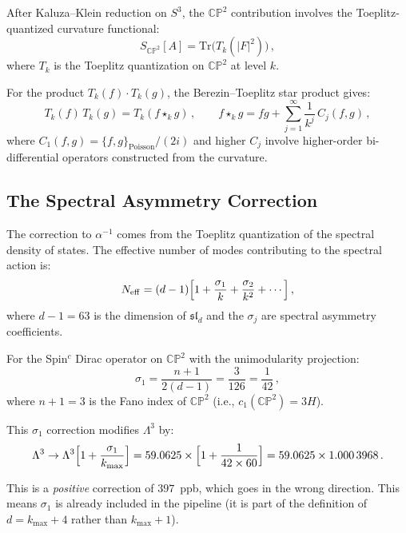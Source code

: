 \documentclass[12pt,a4paper]{article}
\theoremstyle{definition}
\theoremstyle{remark}
\newcommand{\CP}{\mathbb{CP}}
\newcommand{\Tr}{\mathrm{Tr}}
\newcommand{\inv}{^{-1}}
\begin{document}
After Kaluza--Klein reduction on $S^3$, the $\CP^2$ contribution involves
the Toeplitz-quantized curvature functional:
\begin{equation}
S_{\CP^2}[A] = \Tr\bigl(T_k(|F|^2)\bigr)\,,
\end{equation}
where $T_k$ is the Toeplitz quantization on $\CP^2$ at level $k$.

For the product $T_k(f) \cdot T_k(g)$, the Berezin--Toeplitz star product
gives:
\begin{equation}
T_k(f)\,T_k(g) = T_k(f \star_k g)\,,\qquad
f \star_k g = fg + \sum_{j=1}^{\infty} \frac{1}{k^j}\,C_j(f,g)\,,
\end{equation}
where $C_1(f,g) = \{f,g\}_{\mathrm{Poisson}}/(2i)$ and higher $C_j$ involve
higher-order bi-differential operators constructed from the curvature.

\subsection{The Spectral Asymmetry Correction}

The correction to $\alpha\inv$ comes from the Toeplitz quantization of
the spectral density of states. The effective number of modes contributing
to the spectral action is:
\begin{equation}
N_{\mathrm{eff}} = (d-1)\Bigl[1 + \frac{\sigma_1}{k}
  + \frac{\sigma_2}{k^2} + \cdots\Bigr]\,,
\end{equation}
where $d - 1 = 63$ is the dimension of $\mathfrak{sl}_d$ and the $\sigma_j$
are spectral asymmetry coefficients.

For the Spin$^c$ Dirac operator on $\CP^2$ with the unimodularity projection:
\begin{equation}
\sigma_1 = \frac{n+1}{2(d-1)} = \frac{3}{126} = \frac{1}{42}\,,
\end{equation}
where $n + 1 = 3$ is the Fano index of $\CP^2$ (i.e., $c_1(\CP^2) = 3H$).

This $\sigma_1$ correction modifies $\Lambda^3$ by:
\begin{equation}
\Lambda^3 \to \Lambda^3\Bigl[1 + \frac{\sigma_1}{k_{\max}}\Bigr]
= 59.0625 \times \Bigl[1 + \frac{1}{42 \times 60}\Bigr]
= 59.0625 \times 1.000\,3968\,.
\end{equation}

This is a \emph{positive} correction of $397$~ppb, which goes in the wrong
direction. This means $\sigma_1$ is already included in the pipeline (it
is part of the definition of $d = k_{\max} + 4$ rather than $k_{\max} + 1$).
\end{document}
